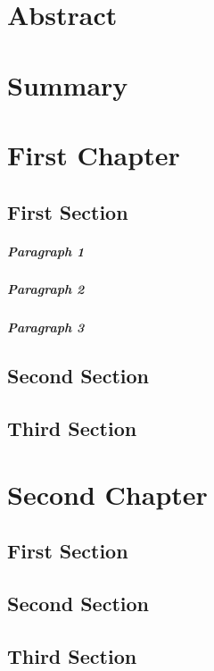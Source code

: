 \documentclass[11pt]{thesis}
\begin{document}
	\maketitle
	
	\begin{frontmatter}
		\chapter{Abstract}
		\lipsum[77-78]
		\chapter{Summary}
		\lipsum[77-90]
		\tableofcontents %
	\end{frontmatter}
	
	\chapter{First Chapter}
		\section{First Section}
			\paragraph{Paragraph 1}
			\lipsum[1-2]
			\paragraph{Paragraph 2}
			\lipsum[3]
			\paragraph{Paragraph 3}
			\lipsum[4-5]
		\section{Second Section}
			\lipsum[6]
		\section{Third Section}
			\lipsum[7-9]
	\chapter{Second Chapter}
		\section[S1]{First Section}
			\lipsum[11-12]
		\section{Second Section}
			\lipsum[13-14]
		\clearpage
		\section[3rd Sec]{Third Section}
			\lipsum[15-17]
\end{document}
